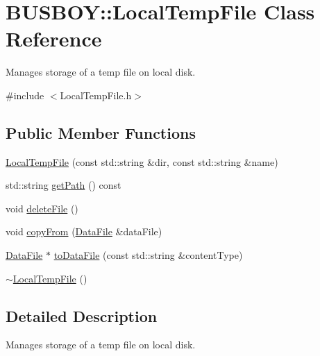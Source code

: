 \hypertarget{classBUSBOY_1_1LocalTempFile}{
\section{BUSBOY::LocalTempFile Class Reference}
\label{classBUSBOY_1_1LocalTempFile}
}


Manages storage of a temp file on local disk.  


{\ttfamily \#include $<$LocalTempFile.h$>$}\subsection*{Public Member Functions}
\begin{DoxyCompactItemize}
\item 
\hyperlink{classBUSBOY_1_1LocalTempFile_ab2ddb8c9d3a4d426195148ea97f2d8b8}{LocalTempFile} (const std::string \&dir, const std::string \&name)
\item 
std::string \hyperlink{classBUSBOY_1_1LocalTempFile_a8556dfd1ac7d544a40885f56beeedd4a}{getPath} () const 
\item 
void \hyperlink{classBUSBOY_1_1LocalTempFile_a5d74e86bea956ab03c76913a3e47c926}{deleteFile} ()
\item 
void \hyperlink{classBUSBOY_1_1LocalTempFile_aa13b601ef9fde5f7169ba003eb337ed2}{copyFrom} (\hyperlink{classBUSBOY_1_1DataFile}{DataFile} \&dataFile)
\item 
\hyperlink{classBUSBOY_1_1DataFile}{DataFile} $\ast$ \hyperlink{classBUSBOY_1_1LocalTempFile_afd98e9e11188217a26a95ca2c723a14e}{toDataFile} (const std::string \&contentType)
\item 
\hyperlink{classBUSBOY_1_1LocalTempFile_a75897f1cbecb23f5c70000b59edbd822}{$\sim$LocalTempFile} ()
\end{DoxyCompactItemize}


\subsection{Detailed Description}
Manages storage of a temp file on local disk. 

